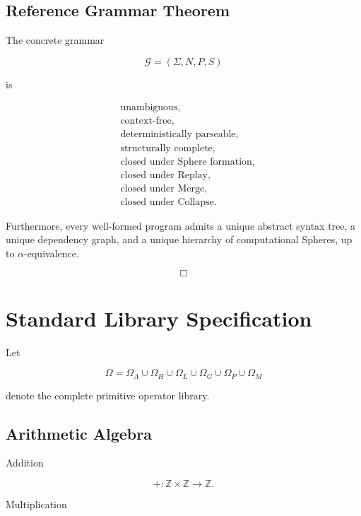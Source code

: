 \documentclass[12pt,oneside]{article}
\theoremstyle{definition}
\theoremstyle{remark}
\begin{document}
\subsection*{Reference Grammar Theorem}

The concrete grammar

\[
\mathcal G
=
(\Sigma,N,P,S)
\]

is

\[
\boxed{
\begin{aligned}
&\text{unambiguous},\\
&\text{context-free},\\
&\text{deterministically parseable},\\
&\text{structurally complete},\\
&\text{closed under Sphere formation},\\
&\text{closed under Replay},\\
&\text{closed under Merge},\\
&\text{closed under Collapse}.
\end{aligned}
}
\]

Furthermore, every well-formed program admits a unique abstract syntax tree,
a unique dependency graph, and a unique hierarchy of computational Spheres,
up to $\alpha$-equivalence.

\[
\Box
\]

\section{Standard Library Specification}

Let

\[
\Omega
=
\Omega_A
\cup
\Omega_H
\cup
\Omega_L
\cup
\Omega_G
\cup
\Omega_P
\cup
\Omega_M
\]

denote the complete primitive operator library.

\subsection*{Arithmetic Algebra}

Addition

\[
+
:
\mathbb Z
\times
\mathbb Z
\rightarrow
\mathbb Z.
\]

Multiplication
\end{document}
